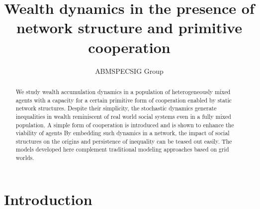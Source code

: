 \documentclass{article}
\author{ABMSPECSIG Group}
\title{Wealth dynamics in the presence of network structure and primitive cooperation}
\begin{document}
\maketitle
\begin{abstract}
We study wealth accumulation dynamics in a population of heterogeneously mixed agents with a capacity for a certain primitive form of cooperation enabled by static network structures. Despite their simplicity, the stochastic dynamics generate inequalities in wealth reminiscent of real world social systems even in a fully mixed population. A simple form of cooperation is introduced and is shown to enhance the viability of agents By embedding such dynamics in a network, the impact of social structures on the origins and persistence of inequality can be teased out easily. The models developed here complement traditional modeling approaches based on grid worlds.   

\end{abstract}
\section{Introduction}



\end{document}
